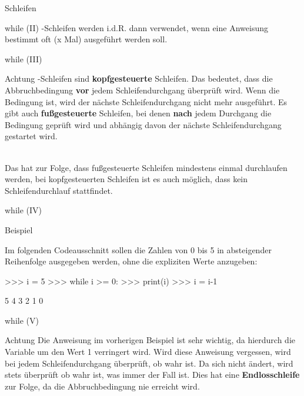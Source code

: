 \begin{subsection}{Schleifen}
\begin{frame}{while (II)}
            -Schleifen werden i.d.R. dann verwendet, wenn eine Anweisung bestimmt oft (x Mal) ausgeführt werden soll.
            
        \end{frame}
        
        \begin{frame}{while (III)}
            \begin{alertblock}{Achtung}
                -Schleifen sind \textbf{kopfgesteuerte} Schleifen. Das bedeutet, dass die Abbruchbedingung \textbf{vor} jedem Schleifendurchgang überprüft wird. Wenn die Bedingung  ist, wird der nächste Schleifendurchgang nicht mehr ausgeführt.
                Es gibt auch \textbf{fußgesteuerte} Schleifen, bei denen \textbf{nach} jedem Durchgang die Bedingung geprüft wird und abhängig davon der nächste Schleifendurchgang gestartet wird. \\~\
                
                Das hat zur Folge, dass fußgesteuerte Schleifen mindestens einmal durchlaufen werden, bei kopfgesteuerten Schleifen ist es auch möglich, dass kein Schleifendurchlauf stattfindet.
            \end{alertblock}
        \end{frame}
        
        \begin{frame}[fragile]{while (IV)}
                \begin{exampleblock}{Beispiel}
                
                Im folgenden Codeausschnitt sollen die Zahlen von 0 bis 5 in absteigender Reihenfolge ausgegeben werden, ohne die expliziten Werte anzugeben:
\begin{pyconcode}
>>> i = 5
>>> while i >= 0:
>>>     print(i)
>>>     i = i-1

5
4
3
2
1
0
\end{pyconcode}                
                \end{exampleblock}
        \end{frame}
        
        \begin{frame}[fragile]{while (V)}
            \begin{alertblock}{Achtung}
                Die Anweisung  im vorherigen Beispiel ist sehr wichtig, da hierdurch die Variable  um den Wert 1 verringert wird. Wird diese Anweisung vergessen, wird bei jedem Schleifendurchgang überprüft, ob  wahr ist. Da sich  nicht ändert, wird stets überprüft ob  wahr ist, was immer der Fall ist. Dies hat eine \textbf{Endlosschleife} zur Folge, da die Abbruchbedingung nie erreicht wird.
            \end{alertblock}
        \end{frame}
        

\end{subsection}
